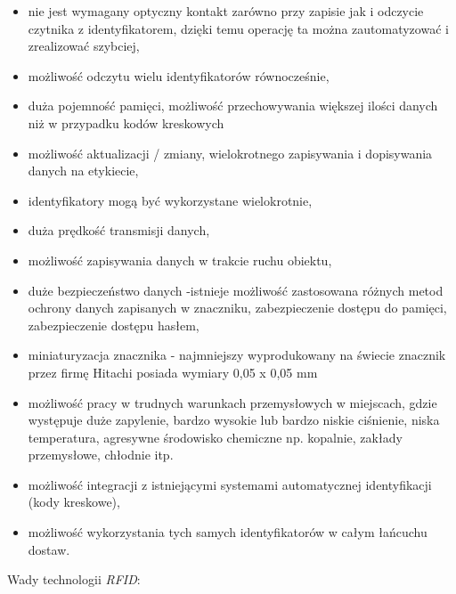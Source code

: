 \begin{itemize}\setlength{\itemsep}{0pt}
	\item nie jest wymagany optyczny kontakt zarówno przy zapisie jak i odczycie czytnika z identyfikatorem, dzięki temu operację ta można zautomatyzować i zrealizować szybciej,
	
	\item możliwość odczytu wielu identyfikatorów równocześnie,
	
	\item duża pojemność pamięci, możliwość przechowywania większej ilości danych niż w przypadku kodów kreskowych

	\item możliwość aktualizacji / zmiany, wielokrotnego zapisywania i dopisywania danych  na etykiecie,

	\item identyfikatory mogą być wykorzystane wielokrotnie,

	\item duża prędkość transmisji danych,

	\item możliwość zapisywania danych w trakcie ruchu obiektu,

	\item duże bezpieczeństwo danych -istnieje możliwość zastosowana różnych metod ochrony danych zapisanych w znaczniku, zabezpieczenie dostępu do pamięci, zabezpieczenie dostępu hasłem,  

	\item miniaturyzacja znacznika - najmniejszy wyprodukowany na świecie znacznik przez firmę Hitachi posiada wymiary 0,05 x 0,05 mm

	\item możliwość pracy w trudnych warunkach przemysłowych w miejscach, gdzie występuje duże zapylenie, bardzo wysokie lub bardzo niskie ciśnienie, niska temperatura, agresywne środowisko chemiczne np. kopalnie, zakłady przemysłowe, chłodnie itp.

	\item możliwość integracji z istniejącymi systemami automatycznej identyfikacji (kody kreskowe),

	\item możliwość wykorzystania tych samych identyfikatorów w całym łańcuchu dostaw.

\end{itemize}

\noindent 
\newline Wady technologii \emph{RFID}:


